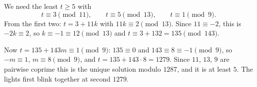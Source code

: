 We need the least $t\ge5$ with
\[t\equiv3\pmod{11},\qquad t\equiv5\pmod{13},\qquad t\equiv1\pmod 9.\]
From the first two: $t=3+11k$ with $11k\equiv2\pmod{13}$. Since $11\equiv-2$, this is $-2k\equiv2$, so $k\equiv-1\equiv12\pmod{13}$ and $t\equiv3+132=135\pmod{143}$.

Now $t=135+143m\equiv1\pmod9$: $135\equiv0$ and $143\equiv8\equiv-1\pmod 9$, so $-m\equiv1$, $m\equiv8\pmod9$, and $t=135+143\cdot8=1279$. Since $11$, $13$, $9$ are pairwise coprime this is the unique solution modulo $1287$, and it is at least $5$. The lights first blink together at second $\boxed{1279}$.
